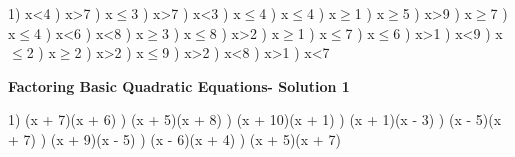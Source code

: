 \documentclass{article}%
\begin{document}
1) x<4%
) x>7%
) x$\leq$3%
) x>7%
) x<3%
) x$\leq$4%
) x$\leq$4%
) x$\geq$1%
) x$\geq$5%
) x>9%
) x$\geq$7%
) x$\leq$4%
) x<6%
) x<8%
) x$\geq$3%
) x$\leq$8%
) x>2%
) x$\geq$1%
) x$\leq$7%
) x$\leq$6%
) x>1%
) x<9%
) x$\leq$2%
) x$\geq$2%
) x>2%
) x$\leq$9%
) x>2%
) x<8%
) x>1%
) x<7%
\newline%
\newpage%
\large%
\begin{center}%
\textbf{Factoring Basic Quadratic Equations- Solution 1}%
\newline%
\end{center} \normalsize%
1) (x + 7)(x + 6)%
) (x + 5)(x + 8)%
) (x + 10)(x + 1)%
) (x + 1)(x - 3)%
) (x - 5)(x + 7)%
) (x + 9)(x - 5)%
) (x - 6)(x + 4)%
) (x + 5)(x + 7)%
\newline%
\end{document}
